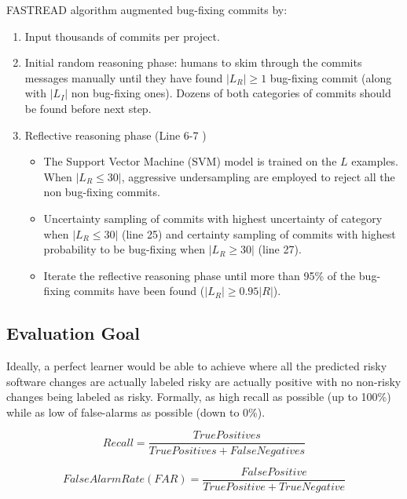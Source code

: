 \documentclass[10pt,conference]{IEEEtran}
\newcommand{\bi}{\begin{itemize}[leftmargin=0.4cm]}
\newcommand{\ei}{\end{itemize}}
\begin{document}
FASTREAD algorithm \cite{Yu2018} augmented bug-fixing commits by:
\begin{enumerate}
    \item Input thousands of commits per project.
    \item Initial random reasoning phase: humans to skim through the commits messages manually until they have found $|L_R| \geq 1$ bug-fixing commit (along with $|L_I|$ non bug-fixing ones). Dozens of both categories of commits should be found before next step.
    \item Reflective reasoning phase (Line 6-7 \cite{Yu2018})
    \bi
    \item The Support Vector Machine (SVM) model is trained on the $L$ examples. When $|L_R \leq 30|$, aggressive undersampling  are employed to reject all the non bug-fixing commits. 
    \item Uncertainty sampling of commits with highest uncertainty of category when $|L_R \leq 30|$ (line 25) and certainty sampling of commits with highest probability to be bug-fixing when $|L_R \geq 30|$ (line 27).   
    \item Iterate the reflective reasoning phase until more than 95\% of the bug-fixing commits have been found ($|L_R| \geq 0.95|R|$).
    \ei
\end{enumerate}



\subsection{Evaluation Goal}

Ideally, a perfect learner would be able to achieve where all the predicted risky software changes are actually labeled risky are actually positive with no non-risky changes being labeled as risky. Formally, as high recall as possible (up to 100\%) while as low of  false-alarms as possible (down to 0\%). 

\vspace{-5pt}
\begin{equation}
 \mathit{Recall} = \frac{\mathit{TruePositives}}{\mathit{TruePositives} + \mathit{FalseNegatives}}
 \end{equation}
 \vspace{-10pt}
 
\begin{equation}
 \mathit{FalseAlarm Rate(FAR)} = \frac{\mathit{FalsePositive}}{\mathit{TruePositive} + \mathit{TrueNegative}}
 \end{equation}
\end{document}
